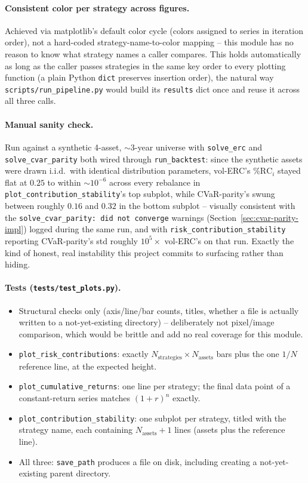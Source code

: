 \documentclass[11pt]{article}
\begin{document}
\paragraph{Consistent color per strategy across figures.} Achieved via
matplotlib's default color cycle (colors assigned to series in
iteration order), not a hard-coded strategy-name-to-color mapping --
this module has no reason to know what strategy names a caller
compares. This holds automatically as long as the caller passes
strategies in the same key order to every plotting function (a plain
Python \texttt{dict} preserves insertion order), the natural way
\texttt{scripts/run\_pipeline.py} would build its \texttt{results} dict
once and reuse it across all three calls.

\paragraph{Manual sanity check.} Run against a synthetic 4-asset,
$\sim$3-year universe with \texttt{solve\_erc} and
\texttt{solve\_cvar\_parity} both wired through \texttt{run\_backtest}:
since the synthetic assets were drawn i.i.d.\ with identical
distribution parameters, vol-ERC's $\%\text{RC}_i$ stayed flat at
$0.25$ to within $\sim 10^{-6}$ across every rebalance in
\texttt{plot\_contribution\_stability}'s top subplot, while
CVaR-parity's swung between roughly $0.16$ and $0.32$ in the bottom
subplot -- visually consistent with the
\texttt{solve\_cvar\_parity: did not converge} warnings
(Section~\ref{sec:cvar-parity-impl}) logged during the same run, and
with \texttt{risk\_contribution\_stability} reporting
CVaR-parity's std roughly $10^5\times$ vol-ERC's on that run. Exactly
the kind of honest, real instability this project commits to surfacing
rather than hiding.

\paragraph{Tests (\texttt{tests/test\_plots.py}).}
\begin{itemize}
    \item Structural checks only (axis/line/bar counts, titles, whether
    a file is actually written to a not-yet-existing directory) --
    deliberately not pixel/image comparison, which would be brittle and
    add no real coverage for this module.
    \item \texttt{plot\_risk\_contributions}: exactly $N_{\text{strategies}}
    \times N_{\text{assets}}$ bars plus the one $1/N$ reference line, at
    the expected height.
    \item \texttt{plot\_cumulative\_returns}: one line per strategy; the
    final data point of a constant-return series matches
    $(1+r)^n$ exactly.
    \item \texttt{plot\_contribution\_stability}: one subplot per
    strategy, titled with the strategy name, each containing
    $N_{\text{assets}} + 1$ lines (assets plus the reference line).
    \item All three: \texttt{save\_path} produces a file on disk,
    including creating a not-yet-existing parent directory.
\end{itemize}
\end{document}
